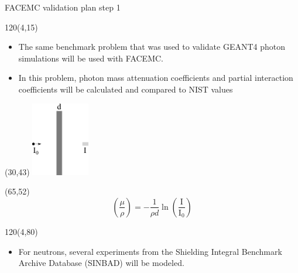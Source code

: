 \documentclass{beamer}
\begin{document}
\begin{frame}{FACEMC validation plan step 1}

  \begin{textblock}{120}(4,15)
    \begin{itemize}
      \item The same benchmark problem that was used to validate GEANT4 photon
        simulations will be used with FACEMC.
      \item In this problem, photon mass attenuation coefficients and partial
        interaction coefficients will be calculated and compared to NIST values
    \end{itemize}
  \end{textblock}
  
  \begin{textblock}{20}(30,43)
    \includegraphics[width=1.0in]{../document/chapters/code_overview/photon_benchmark_problem.pdf}
  \end{textblock}

  \begin{textblock}{20}(65,52)
    \begin{equation*}
      \left(\frac{\mu}{\rho}\right) = -\frac{1}{\rho d}
      \ln{\left(\frac{\text{I}}{\text{I}_0}\right)}
    \end{equation*}
  \end{textblock}

  \begin{textblock}{120}(4,80)
    \begin{itemize}
      \item For neutrons, several experiments from the Shielding Integral
        Benchmark Archive Database (SINBAD) will be modeled.
    \end{itemize}
  \end{textblock}

\end{frame}
\end{document}
